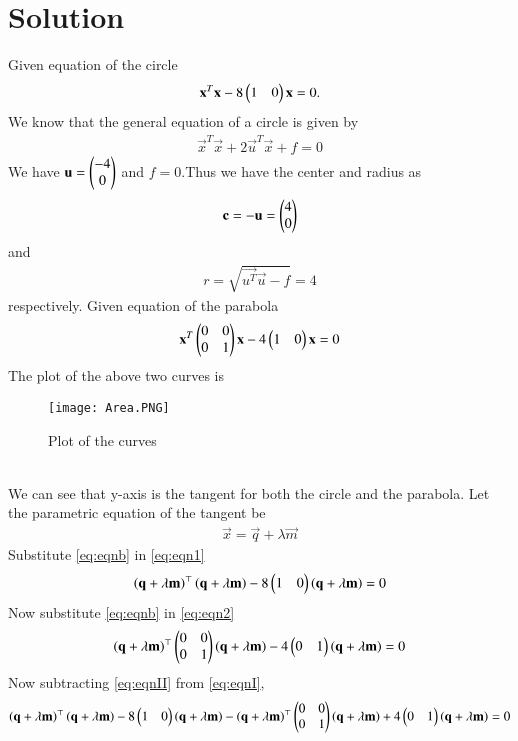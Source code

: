 \documentclass[journal,12pt,twocolumn]{IEEEtran}
\begin{document}
\section{Solution}
Given equation of the circle 
\begin{align}
 \mathbf{x}^T\mathbf{x}-8\begin{pmatrix}1 & 0\end{pmatrix}\mathbf{x}=0.\label{eq:eqn1}  
\end{align}
We know that the general equation of a circle is given by
\begin{align}
  \vec{x}^T\vec{x}+2\vec{u}^T\vec{x}+f=0  
\end{align}
We have $\mathbf{u} = \begin{pmatrix}-4 \\ 0\end{pmatrix}$ and $f = 0$.Thus we have the center and radius as 
\begin{align}
\mathbf{c} = -\mathbf{u} = \begin{pmatrix}4 \\ 0\end{pmatrix}
\end{align} and 
\begin{align}
r= \sqrt{\vec{u^T}\vec{u} - f} = 4
\end{align} respectively.
Given equation of the parabola 
\begin{align}
 \mathbf{x}^T\begin{pmatrix}0&0 \\ 0&1\end{pmatrix}\mathbf{x}-4\begin{pmatrix}1&0\end{pmatrix}\mathbf{x}=0 \label{eq:eqn2}  
\end{align}
The plot of the above two curves is
\begin{figure}[ht]
\centering
\texttt{[image: Area.PNG]}
\caption{Plot of the curves}
\label{Plot of the curves}
\end{figure}
\\
We can see that y-axis is the tangent for both the circle and the parabola.
Let the parametric equation of the tangent be
\begin{align}
    \vec{x} = \vec{q}+\lambda\vec{m} \label{eq:eqnb}
\end{align}
Substitute \eqref{eq:eqnb} in \eqref{eq:eqn1} 
\begin{align}
  \left(\mathbf{q}+\lambda\mathbf{m}\right)^{\top}\left(\mathbf{q}+\lambda\mathbf{m}\right)-8\begin{pmatrix}1&0\end{pmatrix}\left(\mathbf{q}+\lambda\mathbf{m}\right) =0 \label{eq:eqnI}
 \end{align}
Now substitute \eqref{eq:eqnb} in \eqref{eq:eqn2} 
\begin{align}
    \left(\mathbf{q}+\lambda\mathbf{m}\right)^{\top}\begin{pmatrix}0&0 \\ 0&1\end{pmatrix}\left(\mathbf{q}+\lambda\mathbf{m}\right)-4\begin{pmatrix}0&1\end{pmatrix}\left(\mathbf{q}+\lambda\mathbf{m}\right) =0 \label{eq:eqnII}
\end{align}
Now subtracting \eqref{eq:eqnII} from \eqref{eq:eqnI},
\begin{align}
  \left(\mathbf{q}+\lambda\mathbf{m}\right)^{\top}\left(\mathbf{q}+\lambda\mathbf{m}\right)-8\begin{pmatrix}1&0\end{pmatrix}\left(\mathbf{q}+\lambda\mathbf{m}\right)-\left(\mathbf{q}+\lambda\mathbf{m}\right)^{\top}\begin{pmatrix}0&0 \\ 0&1\end{pmatrix}\left(\mathbf{q}+\lambda\mathbf{m}\right)+4\begin{pmatrix}0&1\end{pmatrix}\left(\mathbf{q}+\lambda\mathbf{m}\right) =0 
\end{align}
\end{document}

